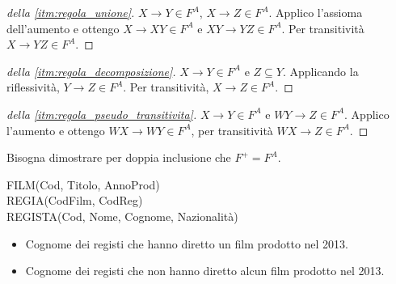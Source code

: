 \begin{proof}[della \ref{itm:regola_unione}]
$X \to Y \in F^A$, $X \to Z \in F^A$. Applico l'assioma dell'aumento e ottengo $X \to XY \in F^A$ e $XY \to YZ \in F^A$. Per transitivit\`a $X \to YZ \in F^A$.
\end{proof}

\begin{proof}[della \ref{itm:regola_decomposizione}]
$X \to Y \in F^A$ e $Z \subseteq Y$. Applicando la riflessivit\`a, $Y \to Z \in F^A$. Per transitivit\`a, $X \to Z \in F^A$.
\end{proof}

\begin{proof}[della \ref{itm:regola_pseudo_transitivita}]
$X \to Y \in F^A$ e $WY \to Z \in F^A$. Applico l'aumento e ottengo $WX \to WY \in F^A$, per transitivit\`a $WX \to Z \in F^A$.
\end{proof}

Bisogna dimostrare per doppia inclusione che $F^+ = F^A$.

\begin{esercizio}
FILM(Cod, Titolo, AnnoProd) \\
REGIA(CodFilm, CodReg) \\
REGISTA(Cod, Nome, Cognome, Nazionalit\`a)

\begin{itemize}
    \item Cognome dei registi che hanno diretto un film prodotto nel 2013.
    \item Cognome dei registi che non hanno diretto alcun film prodotto nel 2013.
\end{itemize}
\end{esercizio}


